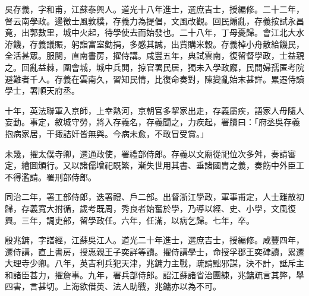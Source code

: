 \begin{pinyinscope}
吳存義，字和甫，江蘇泰興人。道光十八年進士，選庶吉士，授編修。二十二年，督云南學政。邊徼士風敦樸，存義力為提倡，文風改觀。回民煽亂，存義按試永昌竟，出郭數里，城中火起，待學使去而始發也。二十八年，丁母憂歸。會江北大水洊饑，存義議賑，躬詣富室勸捐，多感其誠，出貲購米穀。存義棹小舟散給饑民，全活甚眾。服闋，直南書房，擢侍講。咸豐五年，典試雲南，復留督學政，士益親之。回亂益棘，圍會城，城中兵閧，掠官署民居，獨未入學政廨，民間婦孺匿考院避難者千人。存義在雲南久，習知民情，比復命奏對，陳變亂始末甚詳。累遷侍讀學士，署順天府丞。

十年，英法聯軍入京師，上幸熱河，京朝官多挈家出走，存義屬疾，語家人毋隨人妄動。事定，敘城守勞，將入存義名，存義聞之，力疾起，署牘曰：「府丞吳存義抱病家居，干掫詰奸皆無與。今病未愈，不敢冒受賞。」

未幾，擢太僕寺卿，遷通政使，署禮部侍郎。存義以文廟從祀位次多舛，奏請審定，繪圖頒行。又以諸儒增祀既繁，漸失世用其書、垂諸國胄之義，奏飭中外臣工不得濫請。署刑部侍郎。

同治二年，署工部侍郎，迭署禮、戶二部。出督浙江學政，軍事甫定，人士離散初歸，存義寬大拊循，歲考既周，秀良者始奮於學，乃導以經、史、小學，文風復興。三年，調吏部，留學政任。六年，任滿，以病乞歸。七年，卒。

殷兆鏞，字譜經，江蘇吳江人。道光二十年進士，選庶吉士，授編修。咸豐四年，遷侍講，直上書房，授惠親王子奕詳等讀。擢侍講學士，命授孚郡王奕硉讀，累遷大理寺少卿。八年，英吉利兵犯天津，兆鏞力主戰，疏請黜邪謀，決不計，詆斥主和諸臣甚力，擢詹事。九年，署兵部侍郎。詔江蘇諸省治團練，兆鏞疏言其弊，舉四害，言甚切。上海欲借英、法人助戰，兆鏞亦以為不可。


\end{pinyinscope}
